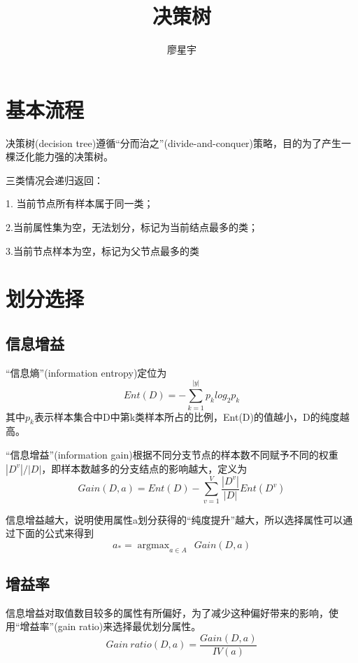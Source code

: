 \documentclass[UTF8]{article}
\author {廖星宇}
\title {决策树}
\begin{document}
\maketitle
\section{基本流程}

决策树(decision tree)遵循“分而治之”(divide-and-conquer)策略，目的为了产生一棵泛化能力强的决策树。

三类情况会递归返回：

1. 当前节点所有样本属于同一类；

2.当前属性集为空，无法划分，标记为当前结点最多的类；

3.当前节点样本为空，标记为父节点最多的类
\\

\section{划分选择}

\subsection{信息增益}
“信息熵”(information entropy)定位为
\begin{equation}
Ent(D) = -\sum_{k=1}^{|y|} p_k log_2 p_k
\end{equation}
其中$p_k$表示样本集合中D中第k类样本所占的比例，Ent(D)的值越小，D的纯度越高。

“信息增益”(information gain)根据不同分支节点的样本数不同赋予不同的权重$|D^{v}|/|D|$，即样本数越多的分支结点的影响越大，定义为
\begin{equation}
  Gain(D, a) = Ent(D) - \sum_{v=1}^{V} \frac{|D^v|}{|D|}Ent(D^v)
\end{equation}

信息增益越大，说明使用属性a划分获得的“纯度提升”越大，所以选择属性可以通过下面的公式来得到
\begin{equation}
	a_{*} = \mathop{\arg\max}_{a \in A} \ \ Gain(D, a)
\end{equation}

\subsection{增益率}
信息增益对取值数目较多的属性有所偏好，为了减少这种偏好带来的影响，使用“增益率”(gain ratio)来选择最优划分属性。
\begin{equation}
  Gain \ ratio(D, a) = \frac{Gain(D, a)}{IV(a)}
\end{equation}
\end{document}

